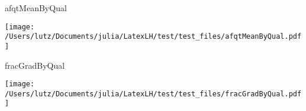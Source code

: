 \begin{frame}{afqtMeanByQual}
\begin{center}
\texttt{[image: /Users/lutz/Documents/julia/LatexLH/test/test\_files/afqtMeanByQual.pdf]}
\end{center}
\end{frame}
\begin{frame}{fracGradByQual}
\begin{center}
\texttt{[image: /Users/lutz/Documents/julia/LatexLH/test/test\_files/fracGradByQual.pdf]}
\end{center}
\end{frame}
